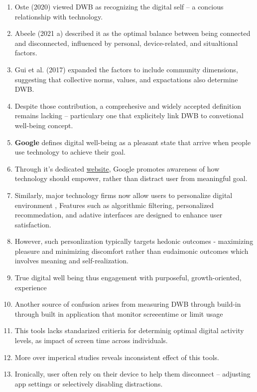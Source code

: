 \documentclass[12pt]{article}
\begin{document}
\begin{enumerate}
    \item Oste (2020) viewed DWB as recognizing the digital self -- a concious relationship with technology.
    \item Abeele (2021 a) described it as the optimal balance between being connected and disconnected, influenced by personal, device-related, and situaltional factors.
    \item Gui et al. (2017) expanded the factors to include community dimensions, suggesting that collective norms, values, and expactations also determine DWB.
    \item Despite those contribution, a comprehesive and widely accepted definition remains lacking -- particulary one that  explicitely link DWB to convetional well-being concept.
    \item \textbf{Google} defines digital well-being as a pleasant state that arrive when people use technology to achieve their goal.
    \item Through it's dedicated  \href{https://wellbeing.google/}{website}, Google promotes awareness of how technology should empower, rather than distract user from meaningful goal.
    \item Similarly, major technology firms now allow users to personalize digital environment \cite{hutmacher2022personalization}, Features such as algorithmic filtering, personalized recommedation, and adative interfaces are designed to enhance user satisfaction.
    \item However, such personlization typically targets hedonic outcomes - maximizing pleasure and minimizing discomfort rather than eudaimonic outcomes which involves meaning and self-realization.
    \item True digital well being thus engagement with purposeful, growth-oriented, experience \cite{hutmacher2022personalization}
    \item Another source of confusion arises from measuring DWB through build-in through built in application that monitor screeentime or limit usage \cite{garciahermoso2020physical, przybylski2017goldilocks, twenge2019technology, whitlock2019screen} 
    \item This tools lacks standarized critieria for determinig optimal digital activity levels, as impact of screen time across individuals.
    \item More over imperical studies reveals inconsistent effect of this tools.
    \item Ironically, user often rely on their device to help them disconnect -- adjusting app settings or selectively disabling distractions.

\end{enumerate}
\end{document}
